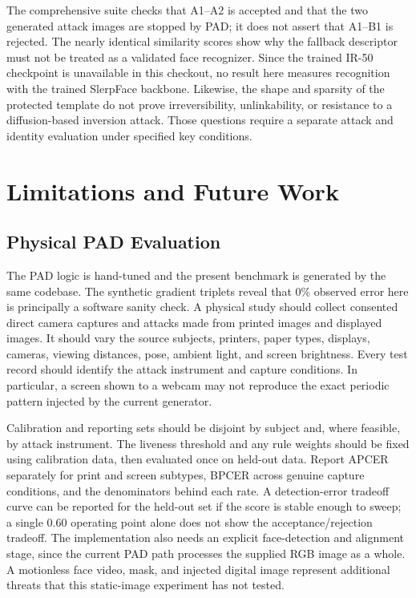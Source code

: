 \documentclass[conference,10pt]{IEEEtran}
\begin{document}
The comprehensive suite checks that A1--A2 is accepted and that the two generated attack images are stopped by PAD; it does not assert that A1--B1 is rejected. The nearly identical similarity scores show why the fallback descriptor must not be treated as a validated face recognizer. Since the trained IR-50 checkpoint is unavailable in this checkout, no result here measures recognition with the trained SlerpFace backbone. Likewise, the shape and sparsity of the protected template do not prove irreversibility, unlinkability, or resistance to a diffusion-based inversion attack. Those questions require a separate attack and identity evaluation under specified key conditions.

\balance
\section{Limitations and Future Work}
\subsection{Physical PAD Evaluation}
The PAD logic is hand-tuned and the present benchmark is generated by the same codebase. The synthetic gradient triplets reveal that 0\% observed error here is principally a software sanity check. A physical study should collect consented direct camera captures and attacks made from printed images and displayed images. It should vary the source subjects, printers, paper types, displays, cameras, viewing distances, pose, ambient light, and screen brightness. Every test record should identify the attack instrument and capture conditions. In particular, a screen shown to a webcam may not reproduce the exact periodic pattern injected by the current generator.

Calibration and reporting sets should be disjoint by subject and, where feasible, by attack instrument. The liveness threshold and any rule weights should be fixed using calibration data, then evaluated once on held-out data. Report APCER separately for print and screen subtypes, BPCER across genuine capture conditions, and the denominators behind each rate. A detection-error tradeoff curve can be reported for the held-out set if the score is stable enough to sweep; a single 0.60 operating point alone does not show the acceptance/rejection tradeoff. The implementation also needs an explicit face-detection and alignment stage, since the current PAD path processes the supplied RGB image as a whole. A motionless face video, mask, and injected digital image represent additional threats that this static-image experiment has not tested.
\end{document}
